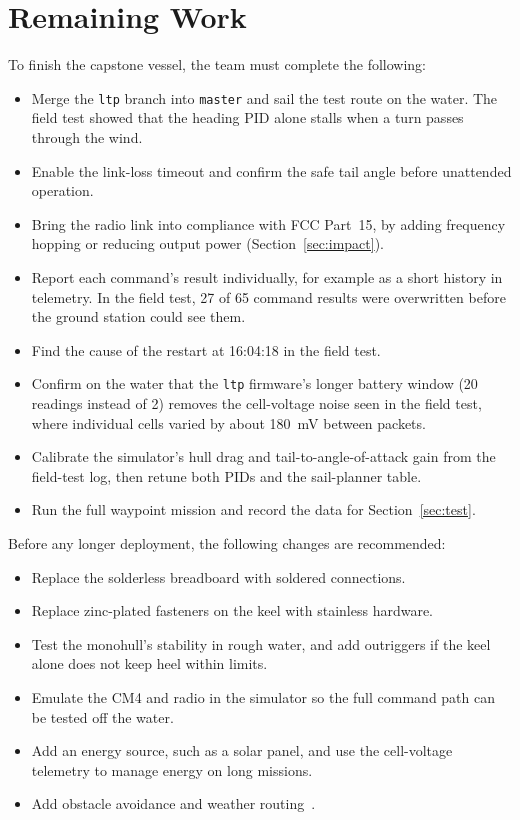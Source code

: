 \section{Remaining Work}
\label{sec:future}

To finish the capstone vessel, the team must complete the following:
\begin{itemize}
\item Merge the \texttt{ltp} branch into \texttt{master} and sail the test
route on the water. The field test showed that the heading PID alone stalls when a
turn passes through the wind.
\item Enable the link-loss timeout and confirm the safe tail angle before
unattended operation.
\item Bring the radio link into compliance with FCC Part~15, by adding
frequency hopping or reducing output power (Section~\ref{sec:impact}).
\item Report each command's result individually, for example as a short
history in telemetry. In the field test, 27 of 65 command results were
overwritten before the ground station could see them.
\item Find the cause of the restart at 16:04:18 in the field test.
\item Confirm on the water that the \texttt{ltp} firmware's longer battery
window (20 readings instead of 2) removes the cell-voltage noise seen in the
field test, where individual cells varied by about \SI{180}{\milli\volt}
between packets.
\item Calibrate the simulator's hull drag and tail-to-angle-of-attack gain
from the field-test log, then retune both PIDs and the sail-planner table.
\item Run the full waypoint mission and record the data for
Section~\ref{sec:test}.
\end{itemize}
Before any longer deployment, the following changes are recommended:
\begin{itemize}
\item Replace the solderless breadboard with soldered connections.
\item Replace zinc-plated fasteners on the keel with stainless hardware.
\item Test the monohull's stability in rough water, and add outriggers if the
keel alone does not keep heel within limits.
\item Emulate the CM4 and radio in the simulator so the full command path can
be tested off the water.
\item Add an energy source, such as a solar panel, and use the cell-voltage
telemetry to manage energy on long missions.
\item Add obstacle avoidance and weather routing~\cite{stelzer2012}.
\end{itemize}